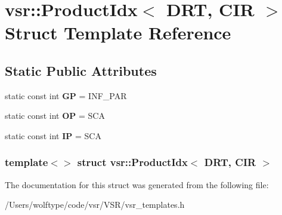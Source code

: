 \hypertarget{structvsr_1_1_product_idx_3_01_d_r_t_00_01_c_i_r_01_4}{\section{vsr\-:\-:Product\-Idx$<$ D\-R\-T, C\-I\-R $>$ Struct Template Reference}
\label{structvsr_1_1_product_idx_3_01_d_r_t_00_01_c_i_r_01_4}
}
\subsection*{Static Public Attributes}
\begin{DoxyCompactItemize}
\item 
\hypertarget{structvsr_1_1_product_idx_3_01_d_r_t_00_01_c_i_r_01_4_a01f1edcebc2e335f46eaf180caea98f2}{static const int {\bfseries G\-P} = I\-N\-F\-\_\-\-P\-A\-R}\label{structvsr_1_1_product_idx_3_01_d_r_t_00_01_c_i_r_01_4_a01f1edcebc2e335f46eaf180caea98f2}

\item 
\hypertarget{structvsr_1_1_product_idx_3_01_d_r_t_00_01_c_i_r_01_4_a70382c81f45728ed450a26c4449f993d}{static const int {\bfseries O\-P} = S\-C\-A}\label{structvsr_1_1_product_idx_3_01_d_r_t_00_01_c_i_r_01_4_a70382c81f45728ed450a26c4449f993d}

\item 
\hypertarget{structvsr_1_1_product_idx_3_01_d_r_t_00_01_c_i_r_01_4_a3daaa82731895d93014c2260e2f28c45}{static const int {\bfseries I\-P} = S\-C\-A}\label{structvsr_1_1_product_idx_3_01_d_r_t_00_01_c_i_r_01_4_a3daaa82731895d93014c2260e2f28c45}

\end{DoxyCompactItemize}
\subsubsection*{template$<$$>$ struct vsr\-::\-Product\-Idx$<$ D\-R\-T, C\-I\-R $>$}



The documentation for this struct was generated from the following file\-:\begin{DoxyCompactItemize}
\item 
/\-Users/wolftype/code/vsr/\-V\-S\-R/vsr\-\_\-templates.\-h\end{DoxyCompactItemize}
